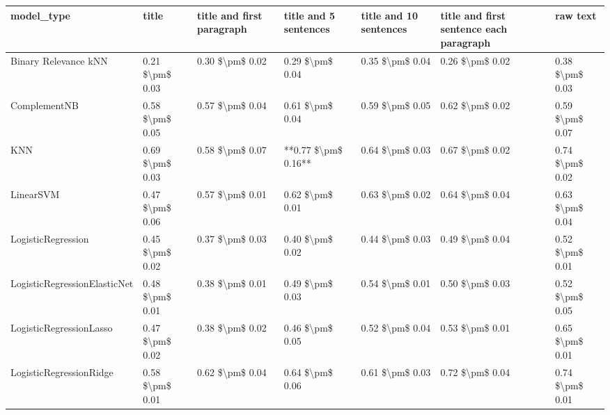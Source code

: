 \begin{tabular}{lllllll}
\toprule
                     model\_type &           title & title and first paragraph & title and 5 sentences & title and 10 sentences & title and first sentence each paragraph &        raw text \\
\midrule
           Binary Relevance kNN & 0.21 \$\textbackslash pm\$ 0.03 &           0.30 \$\textbackslash pm\$ 0.02 &       0.29 \$\textbackslash pm\$ 0.04 &        0.35 \$\textbackslash pm\$ 0.04 &                         0.26 \$\textbackslash pm\$ 0.02 & 0.38 \$\textbackslash pm\$ 0.03 \\
                   ComplementNB & 0.58 \$\textbackslash pm\$ 0.05 &           0.57 \$\textbackslash pm\$ 0.04 &       0.61 \$\textbackslash pm\$ 0.04 &        0.59 \$\textbackslash pm\$ 0.05 &                         0.62 \$\textbackslash pm\$ 0.02 & 0.59 \$\textbackslash pm\$ 0.07 \\
                            KNN & 0.69 \$\textbackslash pm\$ 0.03 &           0.58 \$\textbackslash pm\$ 0.07 &   **0.77 \$\textbackslash pm\$ 0.16** &        0.64 \$\textbackslash pm\$ 0.03 &                         0.67 \$\textbackslash pm\$ 0.02 & 0.74 \$\textbackslash pm\$ 0.02 \\
                      LinearSVM & 0.47 \$\textbackslash pm\$ 0.06 &           0.57 \$\textbackslash pm\$ 0.01 &       0.62 \$\textbackslash pm\$ 0.01 &        0.63 \$\textbackslash pm\$ 0.02 &                         0.64 \$\textbackslash pm\$ 0.04 & 0.63 \$\textbackslash pm\$ 0.04 \\
             LogisticRegression & 0.45 \$\textbackslash pm\$ 0.02 &           0.37 \$\textbackslash pm\$ 0.03 &       0.40 \$\textbackslash pm\$ 0.02 &        0.44 \$\textbackslash pm\$ 0.03 &                         0.49 \$\textbackslash pm\$ 0.04 & 0.52 \$\textbackslash pm\$ 0.01 \\
   LogisticRegressionElasticNet & 0.48 \$\textbackslash pm\$ 0.01 &           0.38 \$\textbackslash pm\$ 0.01 &       0.49 \$\textbackslash pm\$ 0.03 &        0.54 \$\textbackslash pm\$ 0.01 &                         0.50 \$\textbackslash pm\$ 0.03 & 0.52 \$\textbackslash pm\$ 0.05 \\
        LogisticRegressionLasso & 0.47 \$\textbackslash pm\$ 0.02 &           0.38 \$\textbackslash pm\$ 0.02 &       0.46 \$\textbackslash pm\$ 0.05 &        0.52 \$\textbackslash pm\$ 0.04 &                         0.53 \$\textbackslash pm\$ 0.01 & 0.65 \$\textbackslash pm\$ 0.01 \\
        LogisticRegressionRidge & 0.58 \$\textbackslash pm\$ 0.01 &           0.62 \$\textbackslash pm\$ 0.04 &       0.64 \$\textbackslash pm\$ 0.06 &        0.61 \$\textbackslash pm\$ 0.03 &                         0.72 \$\textbackslash pm\$ 0.04 & 0.74 \$\textbackslash pm\$ 0.01 \\

\end{tabular}
